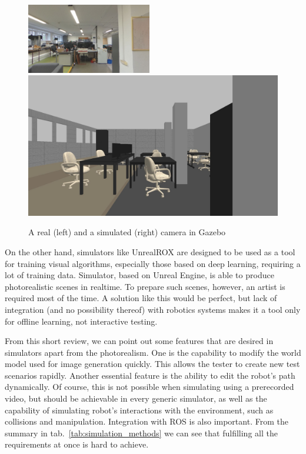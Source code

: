 \documentclass{svproc}
\begin{document}
\begin{figure}[!ht]
    \includegraphics[width=0.485\textwidth]{img/gazebo_vs_real/real.jpg}\hfill%
    \includegraphics[width=0.485\linewidth]{img/gazebo_vs_real/gazebo.jpg}
    \caption{A real (left) and a simulated (right) camera in Gazebo}
    \label{fig:gazebo_vs_real}
\end{figure}

On the other hand, simulators like UnrealROX are designed to be used as a tool for training visual algorithms,
especially those based on deep learning, requiring a lot of training data. Simulator, based on Unreal Engine, 
is able to produce photorealistic scenes in realtime.
To prepare such scenes, 
however, an artist is required most of the time. A solution like this would be perfect, but lack of integration 
(and no possibility thereof) with robotics systems makes it a tool only for offline learning, not interactive
testing.


From this short review, we can point out some features that are desired in simulators \cite{staranowicz2011survey} 
apart from the photorealism.
One is the capability to modify the world model used for image generation quickly.
This allows the tester to create new test scenarios rapidly.
Another essential feature is the ability to edit the robot's path dynamically.
Of course, this is not possible when simulating using a prerecorded video, but should be achievable 
in every generic simulator, as well as the capability of simulating robot's interactions with the
environment, such as collisions and manipulation. Integration with ROS is also important. From the summary
in tab.~\ref{tab:simulation_methods} we can see that fulfilling all the requirements at once is hard to achieve.
\end{document}
